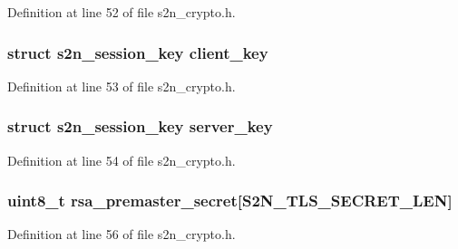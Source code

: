 Definition at line 52 of file s2n\+\_\+crypto.\+h.

\subsubsection[{\texorpdfstring{client\+\_\+key}{client_key}}]{\setlength{\rightskip}{0pt plus 5cm}struct {\bf s2n\+\_\+session\+\_\+key} client\+\_\+key}\hypertarget{structs2n__crypto__parameters_a5310bf07c6a3cac0ed09c19e967a8a27}{}\label{structs2n__crypto__parameters_a5310bf07c6a3cac0ed09c19e967a8a27}


Definition at line 53 of file s2n\+\_\+crypto.\+h.

\subsubsection[{\texorpdfstring{server\+\_\+key}{server_key}}]{\setlength{\rightskip}{0pt plus 5cm}struct {\bf s2n\+\_\+session\+\_\+key} server\+\_\+key}\hypertarget{structs2n__crypto__parameters_a09fdc758a329111328b6a714fab83719}{}\label{structs2n__crypto__parameters_a09fdc758a329111328b6a714fab83719}


Definition at line 54 of file s2n\+\_\+crypto.\+h.

\subsubsection[{\texorpdfstring{rsa\+\_\+premaster\+\_\+secret}{rsa_premaster_secret}}]{\setlength{\rightskip}{0pt plus 5cm}uint8\+\_\+t rsa\+\_\+premaster\+\_\+secret\mbox{[}{\bf S2\+N\+\_\+\+T\+L\+S\+\_\+\+S\+E\+C\+R\+E\+T\+\_\+\+L\+EN}\mbox{]}}\hypertarget{structs2n__crypto__parameters_aff85fd3b06a6aa697da1c520ee9f0714}{}\label{structs2n__crypto__parameters_aff85fd3b06a6aa697da1c520ee9f0714}


Definition at line 56 of file s2n\+\_\+crypto.\+h.

